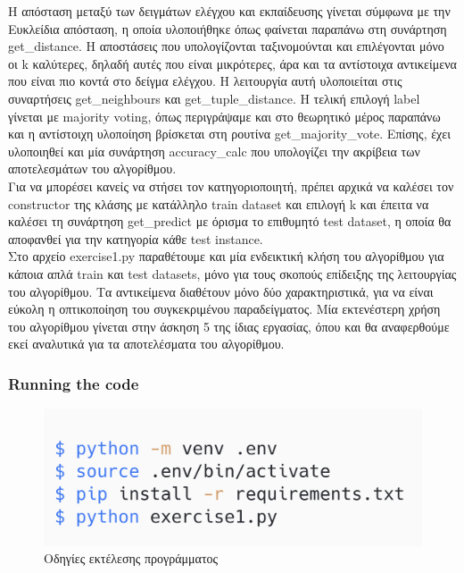 \documentclass[12pt]{article}
\newenvironment{matlab}
	{\begin{figure}[H]\centering\captionsetup{justification=centering}}
	{\end{figure}}
\begin{document}
Η απόσταση μεταξύ των δειγμάτων ελέγχου και εκπαίδευσης γίνεται σύμφωνα με την Ευκλείδια απόσταση, η οποία υλοποιήθηκε όπως φαίνεται παραπάνω στη συνάρτηση get\_distance. Η αποστάσεις που υπολογίζονται ταξινομούνται και επιλέγονται μόνο οι k καλύτερες, δηλαδή αυτές που είναι μικρότερες, άρα και τα αντίστοιχα αντικείμενα που είναι πιο κοντά στο δείγμα ελέγχου. Η λειτουργία αυτή υλοποιείται στις συναρτήσεις get\_neighbours και get\_tuple\_distance. Η τελική επιλογή label γίνεται με majority voting, όπως περιγράψαμε και στο θεωρητικό μέρος παραπάνω και η αντίστοιχη υλοποίηση βρίσκεται στη ρουτίνα get\_majority\_vote. Επίσης, έχει υλοποιηθεί και μία συνάρτηση accuracy\_calc που υπολογίζει την ακρίβεια των αποτελεσμάτων του αλγορίθμου. \\

Για να μπορέσει κανείς να στήσει τον κατηγοριοποιητή, πρέπει αρχικά να καλέσει τον constructor της κλάσης με κατάλληλο train dataset και επιλογή k και έπειτα να καλέσει τη συνάρτηση get\_predict με όρισμα το επιθυμητό test dataset, η οποία θα αποφανθεί για την κατηγορία κάθε test instance. \\

Στο αρχείο exercise1.py παραθέτουμε και μία ενδεικτική κλήση του αλγορίθμου για κάποια απλά train και test datasets, μόνο για τους σκοπούς επίδειξης της λειτουργίας του αλγορίθμου. Τα αντικείμενα διαθέτουν μόνο δύο χαρακτηριστικά, για να είναι εύκολη η οπτικοποίηση του συγκεκριμένου παραδείγματος. Μία εκτενέστερη χρήση του αλγορίθμου γίνεται στην άσκηση 5 της ίδιας εργασίας, όπου και θα αναφερθούμε εκεί αναλυτικά για τα αποτελέσματα του αλγορίθμου. \\

\subsubsection*{Running the code}

\begin{matlab}
	\includegraphics[scale=0.3]{images/exercise1_run.png}
	\caption{Οδηγίες εκτέλεσης προγράμματος}
\end{matlab}
\end{document}
